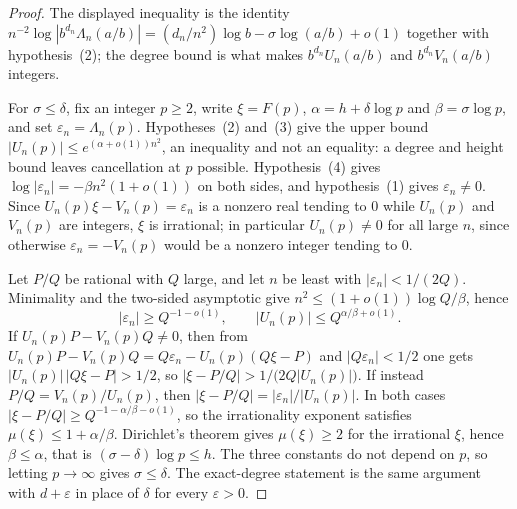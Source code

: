 \documentclass[11pt]{article}
\begin{document}
\begin{proof}
The displayed inequality is the identity
$n^{-2}\log|b^{d_n}\Lambda_n(a/b)|=(d_n/n^{2})\log b-\sigma\log(a/b)+o(1)$
together with hypothesis~(2); the degree bound is what makes
$b^{d_n}U_n(a/b)$ and $b^{d_n}V_n(a/b)$ integers.

For $\sigma\le\delta$, fix an integer $p\ge2$, write $\xi=F(p)$,
$\alpha=h+\delta\log p$ and $\beta=\sigma\log p$, and set
$\varepsilon_n=\Lambda_n(p)$.  Hypotheses~(2) and~(3) give the upper bound
$|U_n(p)|\le e^{(\alpha+o(1))n^{2}}$, an inequality and not an equality: a
degree and height bound leaves cancellation at $p$ possible.  Hypothesis~(4)
gives $\log|\varepsilon_n|=-\beta n^{2}(1+o(1))$ on both sides, and
hypothesis~(1) gives $\varepsilon_n\ne0$.  Since $U_n(p)\xi-V_n(p)=\varepsilon_n$
is a nonzero real tending to $0$ while $U_n(p)$ and $V_n(p)$ are integers, $\xi$
is irrational; in particular $U_n(p)\ne0$ for all large $n$, since otherwise
$\varepsilon_n=-V_n(p)$ would be a nonzero integer tending to $0$.

Let $P/Q$ be rational with $Q$ large, and let $n$ be least with
$|\varepsilon_n|<1/(2Q)$.  Minimality and the two-sided asymptotic give
$n^{2}\le(1+o(1))\log Q/\beta$, hence
\[
 |\varepsilon_n|\ge Q^{-1-o(1)},\qquad |U_n(p)|\le Q^{\alpha/\beta+o(1)} .
\]
If $U_n(p)P-V_n(p)Q\ne0$, then from
$U_n(p)P-V_n(p)Q=Q\varepsilon_n-U_n(p)(Q\xi-P)$ and $|Q\varepsilon_n|<1/2$ one
gets $|U_n(p)|\,|Q\xi-P|>1/2$, so
$|\xi-P/Q|>1/\bigl(2Q|U_n(p)|\bigr)$.  If instead $P/Q=V_n(p)/U_n(p)$, then
$|\xi-P/Q|=|\varepsilon_n|/|U_n(p)|$.  In both cases
$|\xi-P/Q|\ge Q^{-1-\alpha/\beta-o(1)}$, so the irrationality exponent satisfies
$\mu(\xi)\le1+\alpha/\beta$.  Dirichlet's theorem gives $\mu(\xi)\ge2$ for the
irrational $\xi$, hence $\beta\le\alpha$, that is
$(\sigma-\delta)\log p\le h$.  The three constants do not depend on $p$, so
letting $p\to\infty$ gives $\sigma\le\delta$.  The exact-degree statement is the
same argument with $d+\varepsilon$ in place of $\delta$ for every
$\varepsilon>0$.
\end{proof}
\end{document}
